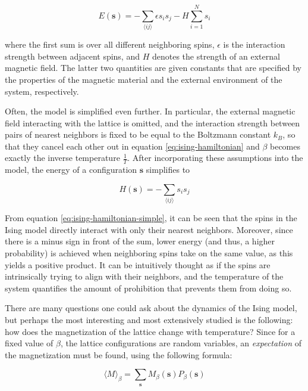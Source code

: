 \documentclass[12pt]{article}
\begin{document}
\begin{equation}
E(\boldsymbol{s}) = - \sum_{\langle ij \rangle} \epsilon s_i s_j - H \sum_{i=1}^N s_i
\label{eq:ising-hamiltonian}
\end{equation}

where the first sum is over all different neighboring spins, $\epsilon$ is the interaction strength between adjacent spins, and $H$ denotes the strength of an external magnetic field. The latter two quantities are given constants that are specified by the properties of the magnetic material and the external environment of the system, respectively.

Often, the model is simplified even further. In particular, the external magnetic field interacting with the lattice is omitted, and the interaction strength between pairs of nearest neighbors is fixed to be equal to the Boltzmann constant $k_B$, so that they cancel each other out in equation \ref{eq:ising-hamiltonian} and $\beta$ becomes exactly the inverse temperature $\frac{1}{T}$. After incorporating these assumptions into the model, the energy of a configuration $\boldsymbol{s}$ simplifies to 

\begin{equation}
H(\boldsymbol{s}) = - \sum_{\langle ij \rangle} s_i s_j
\label{eq:ising-hamiltonian-simple}
\end{equation}

From equation \ref{eq:ising-hamiltonian-simple}, it can be seen that the spins in the Ising model directly interact with only their nearest neighbors. Moreover, since there is a minus sign in front of the sum, lower energy (and thus, a higher probability) is achieved when neighboring spins take on the same value, as this yields a positive product. It can be intuitively thought as if the spins are intrinsically trying to align with their neighbors, and the temperature of the system quantifies the amount of prohibition that prevents them from doing so. 

There are many questions one could ask about the dynamics of the Ising model, but perhaps the most interesting and most extensively studied is the following: how does the magnetization of the lattice change with temperature? Since for a fixed value of $\beta$, the lattice configurations are random variables, an \textit{expectation} of the magnetization must be found, using the following formula:

\begin{equation}
\langle M \rangle_\beta = \sum_{\boldsymbol{s}} M_\beta(\boldsymbol{s}) P_\beta(\boldsymbol{s})
\label{eq:expected-mag-ising}
\end{equation}
\end{document}
